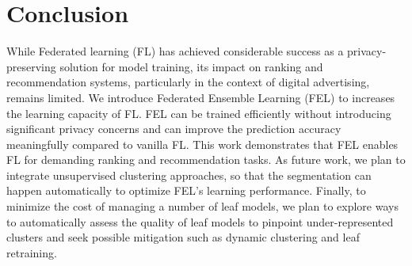 \documentclass{article}
\begin{document}
\section{Conclusion}
\vspace{-0.25cm}
While Federated learning (FL) has achieved considerable success as a privacy-preserving solution for model training, its impact on ranking and recommendation systems, particularly in the context of digital advertising, remains limited. We introduce Federated Ensemble Learning (FEL) to increases the learning capacity of FL.
FEL can be trained efficiently without introducing significant privacy concerns and can improve the prediction accuracy meaningfully compared to vanilla FL.
This work demonstrates that FEL enables FL for demanding ranking and recommendation tasks.
%
As future work, we plan to integrate unsupervised clustering approaches, so that the segmentation can happen automatically to optimize FEL's learning performance.
%
Finally, to minimize the cost of managing a number of leaf models, we plan to explore ways to automatically assess the quality of leaf models to pinpoint under-represented clusters and seek possible mitigation such as dynamic clustering and leaf retraining.



%
%
\end{document}
